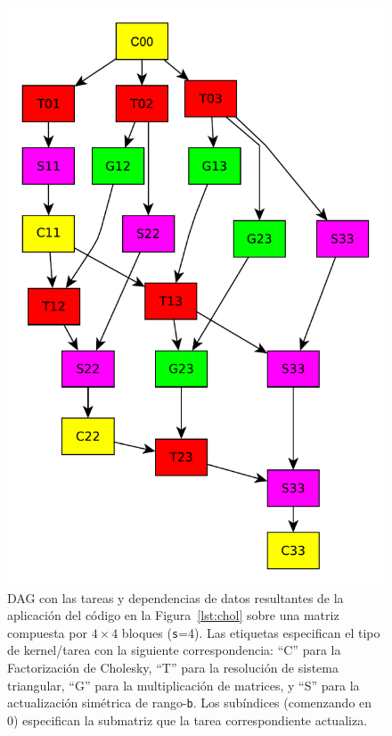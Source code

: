 \begin{figure}%
\begin{center}
\includegraphics[scale=0.35]{Figures/4x4_TaskExample}
\end{center}
\caption{DAG con las tareas y dependencias de datos resultantes de la aplicación del código en la Figura~\ref{lst:chol}
         sobre una matriz compuesta por $4 \times 4$ bloques ({\tt s}=4). Las etiquetas especifican el tipo de kernel/tarea
         con la siguiente correspondencia: 
         ``{\sf C}'' para la Factorización de Cholesky,
         ``{\sf T}'' para la resolución de sistema triangular,
         ``{\sf G}'' para la multiplicación de matrices, y
         ``{\sf S}'' para la actualización simétrica de rango-{\tt b}. 
	 Los subíndices (comenzando en 0) especifican la submatriz que la tarea correspondiente actualiza.}
\label{fig:dag}
\end{figure}

